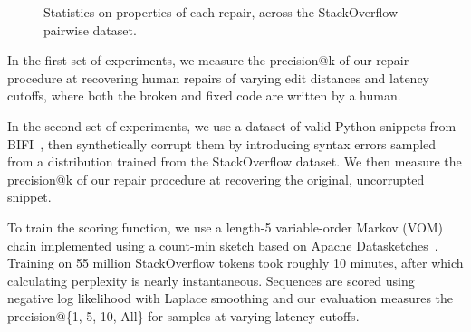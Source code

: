 \documentclass[sigplan,review,anonymous,acmsmall]{acmart}\settopmatter{printfolios=false,printccs=false,printacmref=false}
\begin{document}
\begin{figure}[h!]
    \caption{Statistics on properties of each repair, across the StackOverflow pairwise dataset.}\label{fig:patch_stats}
  \end{figure}

  In the first set of experiments, we measure the precision@k of our repair procedure at recovering human repairs of varying edit distances and latency cutoffs, where both the broken and fixed code are written by a human.

  In the second set of experiments, we use a dataset of valid Python snippets from BIFI~\cite{yasunaga2021break}, then synthetically corrupt them by introducing syntax errors sampled from a distribution trained from the StackOverflow dataset. We then measure the precision@k of our repair procedure at recovering the original, uncorrupted snippet.

  To train the scoring function, we use a length-5 variable-order Markov (VOM) chain implemented using a count-min sketch based on Apache Datasketches~\cite{apache2022datasketches}. Training on 55 million StackOverflow tokens took roughly 10 minutes, after which calculating perplexity is nearly instantaneous. Sequences are scored using negative log likelihood with Laplace smoothing and our evaluation measures the precision@\{1, 5, 10, All\} for samples at varying latency cutoffs.
\end{document}

